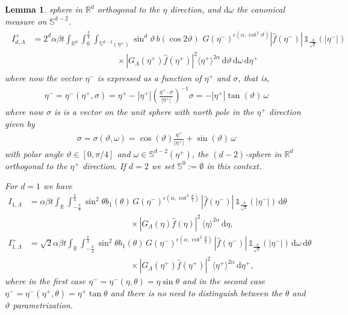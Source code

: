 \documentclass[11pt,a4paper,reqno]{amsart}
\theoremstyle{plain}
\newtheorem{lemma}[proposition]{Lemma}
\theoremstyle{definition}
\begin{document}
\begin{lemma}
	sphere in ${\mathbb{R}}^d$ orthogonal to the $\eta$ direction, and $\mathrm{d}\omega$ the canonical measure on $\mathbb{S}^{d-2}$. 
	\begin{align}\label{eq:Idplus}
	\begin{split}
			I_{d, \Lambda}^+ &= 2^{d} \alpha\beta t\int_{{\mathbb{R}}^d} \int_0^{\frac{\pi}{4}} \int_{{\mathbb{S}}^{d-2}(\eta^+)} \sin^d \vartheta \, b\left( \cos 2\vartheta\right)  \,  \, G(\eta^-)^{\epsilon\left(\alpha, \cot^2\vartheta\right)} |\hat{f}(\eta^-)|\, {\mathds{1}}_{\tfrac{\Lambda}{\sqrt{2}}}(|\eta^-|)\\  & \qquad \qquad \qquad \qquad \qquad  \times |G_{\Lambda}(\eta^+) \hat{f}(\eta^+)|^2 \langle\eta^+\rangle^{2\alpha} \, \mathrm{d}\vartheta\,\mathrm{d}\omega \,\mathrm{d}\eta^+
	\end{split}
	\end{align}
	where now the vector $\eta^-$ is expressed as a function of $\eta^+$ and $\sigma$, that is,
	\begin{align}\label{eq:etapluspar}
		\eta^-= \eta^-(\eta^+,\sigma) = \eta^+ - |\eta^+|\left(\frac{\eta^+\cdot\sigma}{|\eta^+|}\right)^{-1}\sigma = -|\eta^+| \tan (\vartheta) \, \omega
	\end{align}
	where now $\sigma$ is is a vector on the unit sphere with north pole in the $\eta^+$ direction given by
	\begin{align}\label{eq:sigmaetaplus}
		\sigma =\sigma(\vartheta,\omega)= \cos(\vartheta) \frac{\eta^+}{|\eta^+|} + \sin (\vartheta)\, \omega
	\end{align}
	with polar angle $\vartheta \in [0,\pi/4]$  and $\omega\in {\mathbb{S}}^{d-2}(\eta^+)$, the $(d-2)$-sphere in ${\mathbb{R}}^d$ orthogonal to the $\eta^+$ direction.
	If $d=2$ we set ${\mathbb{S}}^0:=\emptyset$ in this context.
	
	For $d=1$ we have
	\begin{align*}
		I_{1, \Lambda} &=  \alpha \beta t \int_{\mathbb{R}}\int_{-\tfrac{\pi}{4}}^{\tfrac{\pi}{4}} \sin^{2}\theta b_1(\theta)\, G(\eta^-)^{\epsilon\left(\alpha, \cot^2\tfrac{\theta}{2}\right)}\,|\hat{f}(\eta^-)| \, {\mathds{1}}_{\tfrac{\Lambda}{\sqrt{2}}}(|\eta^-|) \,\mathrm{d}\theta\\
		&\qquad \qquad \qquad \qquad \qquad \qquad \times |G_{\Lambda}(\eta) \hat{f}(\eta)|^2 \,\langle \eta \rangle^{2\alpha}\,\mathrm{d}\eta, \\
		I_{1, \Lambda}^+ &= \sqrt{2} \alpha \beta t \int_{\mathbb{R}}\int_{-\tfrac{\pi}{4}}^{\tfrac{\pi}{4}} \sin^{2}\theta b_1(\theta)\, G(\eta^-)^{\epsilon\left(\alpha, \cot^2\tfrac{\theta}{2}\right)} \,|\hat{f}(\eta^-)| \, {\mathds{1}}_{\tfrac{\Lambda}{\sqrt{2}}}(|\eta^-|) \,\mathrm{d}\omega\,\mathrm{d}\theta\\
		&\qquad \qquad \qquad \qquad \qquad \qquad \times |G_{\Lambda}(\eta^+) \hat{f}(\eta^+)|^2 \,\langle \eta^+ \rangle^{2\alpha}\,\mathrm{d}\eta^+,
	\end{align*}
	where in the first case $\eta^-=\eta^-(\eta,\theta)= \eta \sin \theta$ and in the second case $\eta^-= \eta^-(\eta^+,\theta)= \eta^+\tan\theta$ and there is no need to distinguish between the $\theta$ and $\vartheta$ parametrization.
\end{lemma}
\end{document}

